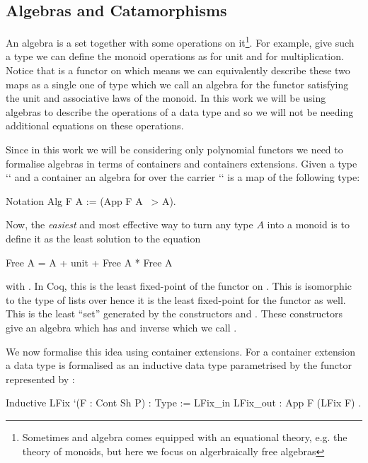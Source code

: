 \documentclass[anonymous, a4paper, UKenglish, cleveref, autoref, thm-restate]{lipics-v2021}
\begin{document}
\subsection{Algebras and Catamorphisms}
\label{sec:algebras} An algebra is a set  together with some operations
on it\footnote[1]{Sometimes and algebra comes equipped with an equational
theory, e.g. the theory of monoids, but here we focus on algerbraically free
algebras}.  For example, give such a type  we can define the monoid
operations as  for unit and  for
multiplication. Notice that  is a functor on 
which means we can equivalently describe these two maps as a single one of
type  which we call an algebra for the functor 
satisfying the unit and associative laws of the monoid.  In this work we will be
using algebras to describe the operations of a data type and so we will not be
needing additional equations on these operations.

Since in this work we will be considering only polynomial functors we need to
formalise algebras in terms of containers and containers extensions. Given a
type `` and a container  an algebra for  over the carrier
`` is a map of the following type:
\begin{coqcode}
Notation Alg F A := (App F A ~> A).
\end{coqcode}

Now, the \emph{easiest} and most effective way to turn any type $A$ into a
monoid is to define it as the least solution to the equation
\begin{coqcode}
Free A = A + unit + Free A * Free A
\end{coqcode}
with . In Coq, this is the least fixed-point of the
functor  on .  This is isomorphic to the type of
lists over  hence it is the least fixed-point for the
functor  as well. This is the least ``set'' generated by the
constructors  and .
These constructors give an algebra 
which has and inverse which we call .

We now formalise this idea using container extensions.  For a container
extension a data type is formalised as an inductive data type parametrised by
the functor represented by :
\begin{coqcode}
Inductive LFix `(F : Cont Sh P) : Type := LFix_in { LFix_out : App F (LFix F) }.
\end{coqcode}
\end{document}
